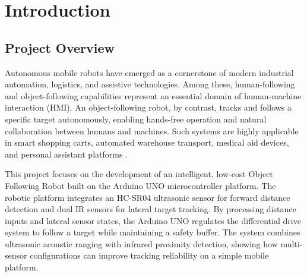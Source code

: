 \documentclass[12pt,a4paper,oneside]{report}
\begin{document}

\chapter{Introduction}
\section{Project Overview}
Autonomous mobile robots have emerged as a cornerstone of modern industrial automation, logistics, and assistive technologies. Among these, human-following and object-following capabilities represent an essential domain of human-machine interaction (HMI). An object-following robot, by contrast, tracks and follows a specific target autonomously, enabling hands-free operation and natural collaboration between humans and machines. Such systems are highly applicable in smart shopping carts, automated warehouse transport, medical aid devices, and personal assistant platforms \cite{arduino_ref}.\par
\medskip
This project focuses on the development of an intelligent, low-cost Object Following Robot built on the Arduino UNO microcontroller platform. The robotic platform integrates an HC-SR04 ultrasonic sensor for forward distance detection and dual IR sensors for lateral target tracking. By processing distance inputs and lateral sensor states, the Arduino UNO regulates the differential drive system to follow a target while maintaining a safety buffer. The system combines ultrasonic acoustic ranging with infrared proximity detection, showing how multi-sensor configurations can improve tracking reliability on a simple mobile platform.
\end{document}

